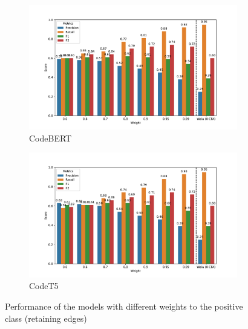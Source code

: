 \begin{figure}[]
    \centering
    \begin{subfigure}[b]{\imgSize}  %
        \centering
        \includegraphics[width=\linewidth]{chapters/ch1/figs/codebert_rq2_fig.pdf}  %
        \caption{CodeBERT}
        \label{ch1:fig:sub1}
    \end{subfigure}
    \vspace{1em}  %
    
    \begin{subfigure}[b]{\imgSize}  %
        \centering
        \includegraphics[width=\linewidth]{chapters/ch1/figs/codet5_rq2_fig.pdf}  %
        \caption{CodeT5}
        \label{ch1:fig:sub2}
    \end{subfigure}
    
    \caption{Performance of the models with different weights to the positive class (retaining edges)}
    \label{ch1:fig:weighting-models}
\end{figure}

